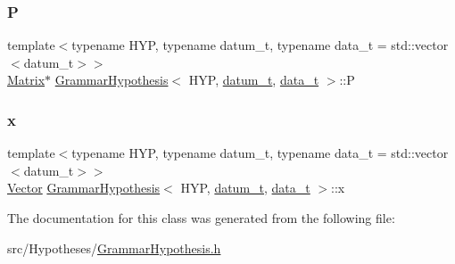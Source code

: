 \mbox{\label{class_grammar_hypothesis_aac415f896cdeb3ab3b93bdbc87dc50a4}} 
\subsubsection{\texorpdfstring{P}{P}}
{\footnotesize\ttfamily template$<$typename H\+YP, typename datum\+\_\+t, typename data\+\_\+t = std\+::vector$<$datum\+\_\+t$>$$>$ \\
\hyperlink{_eigen_numerics_8h_a645222978e81acfb2523a9bce34aecc0}{Matrix}$\ast$ \hyperlink{class_grammar_hypothesis}{Grammar\+Hypothesis}$<$ H\+YP, \hyperlink{class_bayesable_a9f1a6c0cd7855550fa10b1a8f13a5867}{datum\+\_\+t}, \hyperlink{class_bayesable_aa2788c4d7718c0a824e1d28c4c98f921}{data\+\_\+t} $>$\+::P}

\mbox{\label{class_grammar_hypothesis_a57d7f73f465b70294a8b4ef2b3f5dbbb}} 
\subsubsection{\texorpdfstring{x}{x}}
{\footnotesize\ttfamily template$<$typename H\+YP, typename datum\+\_\+t, typename data\+\_\+t = std\+::vector$<$datum\+\_\+t$>$$>$ \\
\hyperlink{_eigen_numerics_8h_aca2956bc379bce2ed88ab3c0e1b61d1d}{Vector} \hyperlink{class_grammar_hypothesis}{Grammar\+Hypothesis}$<$ H\+YP, \hyperlink{class_bayesable_a9f1a6c0cd7855550fa10b1a8f13a5867}{datum\+\_\+t}, \hyperlink{class_bayesable_aa2788c4d7718c0a824e1d28c4c98f921}{data\+\_\+t} $>$\+::x}



The documentation for this class was generated from the following file\+:\begin{DoxyCompactItemize}
\item 
src/\+Hypotheses/\hyperlink{_grammar_hypothesis_8h}{Grammar\+Hypothesis.\+h}\end{DoxyCompactItemize}
